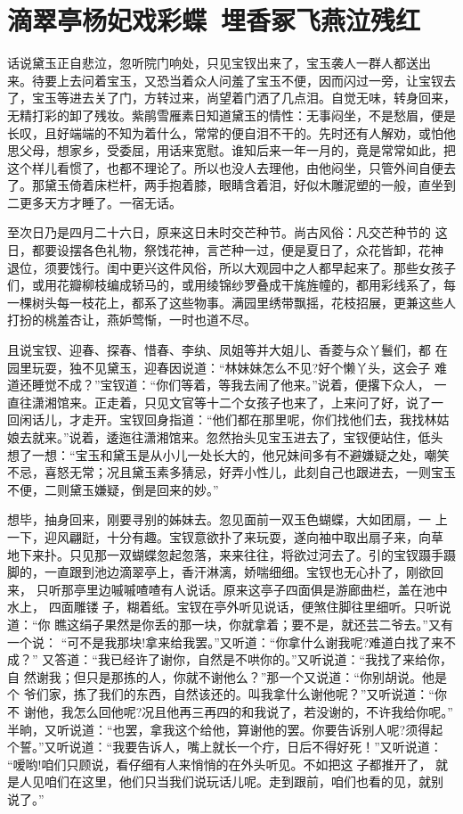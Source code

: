 \chapter{滴翠亭杨妃戏彩蝶~埋香冢飞燕泣残红}

话说黛玉正自悲泣，忽听院门响处，只见宝钗出来了，宝玉袭人一群人都送出
来。待要上去问着宝玉，又恐当着众人问羞了宝玉不便，因而闪过一旁，让宝钗去
了，宝玉等进去关了门，方转过来，尚望着门洒了几点泪。自觉无味，转身回来，
无精打彩的卸了残妆。紫鹃雪雁素日知道黛玉的情性：无事闷坐，不是愁眉，便是
长叹，且好端端的不知为着什么，常常的便自泪不干的。先时还有人解劝，或怕他
思父母，想家乡，受委屈，用话来宽慰。谁知后来一年一月的，竟是常常如此，把
这个样儿看惯了，也都不理论了。所以也没人去理他，由他闷坐，只管外间自便去
了。那黛玉倚着床栏杆，两手抱着膝，眼睛含着泪，好似木雕泥塑的一般，直坐到
二更多天方才睡了。一宿无话。

至次日乃是四月二十六日，原来这日未时交芒种节。尚古风俗：凡交芒种节的
这日，都要设摆各色礼物，祭饯花神，言芒种一过，便是夏日了，众花皆卸，花神
退位，须要饯行。闺中更兴这件风俗，所以大观园中之人都早起来了。那些女孩子
们，或用花瓣柳枝编成轿马的，或用绫锦纱罗叠成干旄旌幢的，都用彩线系了，每
一棵树头每一枝花上，都系了这些物事。满园里绣带飘摇，花枝招展，更兼这些人
打扮的桃羞杏让，燕妒莺惭，一时也道不尽。

且说宝钗、迎春、探春、惜春、李纨、凤姐等并大姐儿、香菱与众丫鬟们，都
在园里玩耍，独不见黛玉，迎春因说道：“林妹妹怎么不见?好个懒丫头，这会子
难道还睡觉不成？”宝钗道：“你们等着，等我去闹了他来。”说着，便撂下众人，
一直往潇湘馆来。正走着，只见文官等十二个女孩子也来了，上来问了好，说了一
回闲话儿，才走开。宝钗回身指道：“他们都在那里呢，你们找他们去，我找林姑
娘去就来。”说着，逶迤往潇湘馆来。忽然抬头见宝玉进去了，宝钗便站住，低头
想了一想：“宝玉和黛玉是从小儿一处长大的，他兄妹间多有不避嫌疑之处，嘲笑
不忌，喜怒无常；况且黛玉素多猜忌，好弄小性儿，此刻自己也跟进去，一则宝玉
不便，二则黛玉嫌疑，倒是回来的妙。”

想毕，抽身回来，刚要寻别的姊妹去。忽见面前一双玉色蝴蝶，大如团扇，一
上一下，迎风翩跹，十分有趣。宝钗意欲扑了来玩耍，遂向袖中取出扇子来，向草
地下来扑。只见那一双蝴蝶忽起忽落，来来往往，将欲过河去了。引的宝钗蹑手蹑
脚的，一直跟到池边滴翠亭上，香汗淋漓，娇喘细细。宝钗也无心扑了，刚欲回来，
只听那亭里边嘁嘁喳喳有人说话。原来这亭子四面俱是游廊曲栏，盖在池中水上，
四面雕镂子，糊着纸。宝钗在亭外听见说话，便煞住脚往里细听。只听说道：“你
瞧这绢子果然是你丢的那一块，你就拿着；要不是，就还芸二爷去。”又有一个说：
“可不是我那块!拿来给我罢。”又听道：“你拿什么谢我呢?难道白找了来不成？”
又答道：“我已经许了谢你，自然是不哄你的。”又听说道：“我找了来给你，自
然谢我；但只是那拣的人，你就不谢他么？”那一个又说道：“你别胡说。他是个
爷们家，拣了我们的东西，自然该还的。叫我拿什么谢他呢？”又听说道：“你不
谢他，我怎么回他呢?况且他再三再四的和我说了，若没谢的，不许我给你呢。”
半晌，又听说道：“也罢，拿我这个给他，算谢他的罢。你要告诉别人呢?须得起
个誓。”又听说道：“我要告诉人，嘴上就长一个疔，日后不得好死！”又听说道：
“嗳哟!咱们只顾说，看仔细有人来悄悄的在外头听见。不如把这子都推开了，
就是人见咱们在这里，他们只当我们说玩话儿呢。走到跟前，咱们也看的见，就别
说了。”

